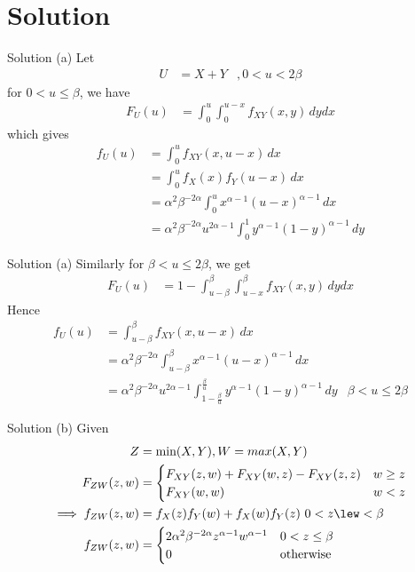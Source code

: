 \documentclass{beamer}
\begin{document}
\section{Solution}
\begin{frame}{Solution (a)}
Let 
\begin{align}
    U &= X + Y &, 0 < u < 2\beta
\end{align}
for $0 < u \le \beta$, we have
\begin{align}
    F_U(u) &= \int_0^u\int_0^{u-x}f_{XY}(x,y)\,dydx
\end{align}
which gives 
\begin{align}
    f_U(u) &= \int_0^uf_{XY}(x,u-x)\,dx \\
    &= \int_0^u f_X(x)f_Y(u-x)\,dx\\
    &= \alpha^2\beta^{-2\alpha}\int_0^ux^{\alpha-1}(u-x)^{\alpha -1}\,dx\\
    &= \alpha^2\beta^{-2\alpha}u^{2\alpha-1}\int_0^1y^{\alpha-1}(1-y)^{\alpha-1}\, dy
\end{align}
\end{frame}
\begin{frame}{Solution (a)}
    Similarly for $\beta < u \le 2\beta$, we get
    \begin{align}
        F_U(u) &= 1 - \int_{u-\beta}^\beta\int_{u-x}^\beta f_{XY}(x,y)\, dydx
    \end{align}
    Hence
    \begin{align}
        f_U(u) &= \int_{u-\beta}^\beta f_{XY}(x,u-x)\,dx \\
        &= \alpha^2\beta^{-2\alpha}\int_{u-\beta}^{\beta}x^{\alpha-1}(u-x)^{\alpha-1}\, dx\\
        &= \alpha^2\beta^{-2\alpha}u^{2\alpha-1}\int_{1-\frac{\beta}{u}}^{\frac{\beta}{u}}y^{\alpha-1}(1-y)^{\alpha-1}\,dy & \beta < u \le 2\beta
    \end{align}
\end{frame}
\begin{frame}{Solution (b)}
Given
\begin{align}
    Z &= \text{min}(X,Y) ,W = max(X,Y)\\
    F_{ZW}(z,w) &= \begin{cases}
                    F_{XY}(z,w) + F_{XY}(w,z) - F_{XY}(z,z) & w\ge z\\
                    F_{XY}(w,w) & w < z
                    \end{cases}\\
    \implies f_{ZW}(z,w) &= f_X(z)f_Y(w) + f_X(w)f_Y(z) \text{   } 0<z\lew<\beta\\
    f_{ZW}(z,w) &= \begin{cases}
                    2\alpha^2\beta^{-2\alpha}z^{\alpha-1}w^{\alpha-1} & 0<z\le\beta\\
                    0 & \text{otherwise}
                    \end{cases}
\end{align}
\end{frame}
\end{document}
